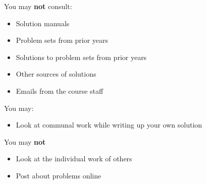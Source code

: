 \documentclass[12pt,letterpaper,noanswers]{exam}
\begin{document}
\noindent You may \textbf{not} consult:
\begin{multicols}{2}
\begin{itemize}
\itemsep-0.2em
    \item Solution manuals
    \item Problem sets from prior years
    \item Solutions to problem sets from prior years
    \item Other sources of solutions
    \item Emails from the course staff
\end{itemize}
\end{multicols}

\noindent You may:
\begin{itemize}
    \item Look at communal work while writing up your own solution
\end{itemize}

\noindent You may \textbf{not}
\begin{itemize}
\itemsep-0.2em
    \item Look at the individual work of others
    \item Post about problems online
\end{itemize}

\eject
\end{document}
